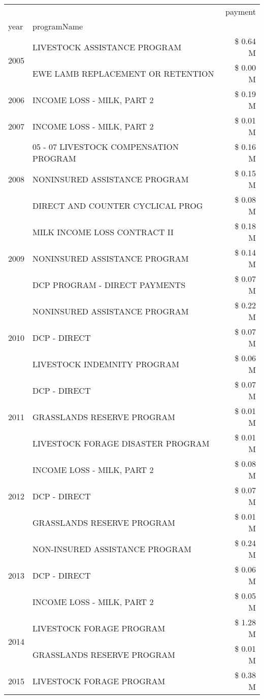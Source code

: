 \begin{tabular}{llr}
\toprule
 &  & payment \\
year & programName &  \\
\midrule
\multirow[t]{2}{*}{2005} & LIVESTOCK ASSISTANCE PROGRAM & \$ 0.64 M \\
 & EWE LAMB REPLACEMENT OR RETENTION & \$ 0.00 M \\
\cline{1-3}
2006 & INCOME LOSS - MILK, PART 2 & \$ 0.19 M \\
\cline{1-3}
2007 & INCOME LOSS - MILK, PART 2 & \$ 0.01 M \\
\cline{1-3}
\multirow[t]{3}{*}{2008} & 05 - 07 LIVESTOCK COMPENSATION PROGRAM & \$ 0.16 M \\
 & NONINSURED ASSISTANCE PROGRAM & \$ 0.15 M \\
 & DIRECT AND COUNTER CYCLICAL PROG & \$ 0.08 M \\
\cline{1-3}
\multirow[t]{3}{*}{2009} & MILK INCOME LOSS CONTRACT II & \$ 0.18 M \\
 & NONINSURED ASSISTANCE PROGRAM & \$ 0.14 M \\
 & DCP PROGRAM - DIRECT PAYMENTS & \$ 0.07 M \\
\cline{1-3}
\multirow[t]{3}{*}{2010} & NONINSURED ASSISTANCE PROGRAM & \$ 0.22 M \\
 & DCP - DIRECT & \$ 0.07 M \\
 & LIVESTOCK INDEMNITY PROGRAM & \$ 0.06 M \\
\cline{1-3}
\multirow[t]{3}{*}{2011} & DCP - DIRECT & \$ 0.07 M \\
 & GRASSLANDS RESERVE PROGRAM & \$ 0.01 M \\
 & LIVESTOCK FORAGE DISASTER PROGRAM & \$ 0.01 M \\
\cline{1-3}
\multirow[t]{3}{*}{2012} & INCOME LOSS - MILK, PART 2 & \$ 0.08 M \\
 & DCP - DIRECT & \$ 0.07 M \\
 & GRASSLANDS RESERVE PROGRAM & \$ 0.01 M \\
\cline{1-3}
\multirow[t]{3}{*}{2013} & NON-INSURED ASSISTANCE PROGRAM & \$ 0.24 M \\
 & DCP - DIRECT & \$ 0.06 M \\
 & INCOME LOSS - MILK, PART 2 & \$ 0.05 M \\
\cline{1-3}
\multirow[t]{2}{*}{2014} & LIVESTOCK FORAGE PROGRAM & \$ 1.28 M \\
 & GRASSLANDS RESERVE PROGRAM & \$ 0.01 M \\
\cline{1-3}
\multirow[t]{3}{*}{2015} & LIVESTOCK FORAGE PROGRAM & \$ 0.38 M \\

\end{tabular}
